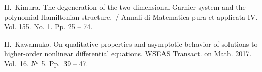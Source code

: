 
%

\begin{thebibliography}{9} %
 H.~Kimura. The degeneration of the two dimensional Garnier system and the polynomial Hamiltonian structure.~/ Annali 
di Matematica pura et applicata IV. Vol. 155. No. 1. Pp. 25 -- 74. 

 H.~Kawamuko. On qualitative properties and asymptotic behavior of solutions to higher-order nonlinear differential equations. 
WSEAS Transact. on Math. 2017. Vol.~16. №~5. Pp.~39 -- 47. 

\end{thebibliography}





%
